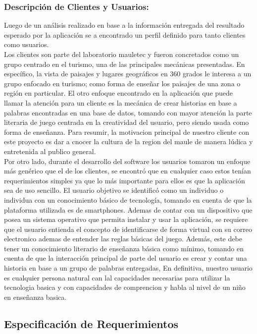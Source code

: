 \subsubsection{Descripción de Clientes y Usuarios:}
Luego de un análisis realizado en base a la información entregada del resultado esperado por la aplicación se a encontrado un perfil definido para tanto clientes como usuarios.\\
Los clientes son parte del laboratorio mauletec y fueron concretados como un grupo centrado en el turismo, una de las principales mecánicas presentadas. En específico, la vista de paisajes y lugares geográficos en 360 grados le interesa a un grupo enfocado en turismo; como forma de enseñar los paisajes de una zona o región en particular. El otro enfoque encontrado en la aplicación que puede llamar la atención para un cliente es la mecánica de crear historias en base a palabras encontradas en una base de datos, tomando con mayor atención la parte literaria de juego centrada en la creatividad del usuario, pero siendo usada como forma de enseñanza. Para resumir, la motivacion principal de nuestro cliente con este proyecto es dar a cnocer la cultura de la region del maule de manera lúdica y entretenida al publico general.\\
Por otro lado, durante el desarrollo del software los usuarios tomaron un enfoque más genérico que el de los clientes, se encontró que en cualquier caso estos tenían requerimientos  simples ya que lo más importante para ellos es que la aplicación sea de uso sencillo. El usuario objetivo se identificó como un individuo o individua con un conocimiento básico de tecnología, tomando en cuenta de que la plataforma utilizada es de smartphones. Ademas de contar con un dispositivo que posea un sistema operativo que permita instalar y usar la aplicación, se requiere que el usuario entienda el concepto de identificarse de forma virtual con su correo electronico ademas de entender las reglas básicas del juego. Además, este debe tener un conocimiento literario de enseñanza básica como mínimo, tomando en cuenta de que la interacción principal de parte del usuario es crear y contar una historia en base a un grupo de palabras entregadas, En definitiva, nuestro usuario es cualquier persona natural can lal capacidades necesarias para utilizar la tecnologia basica y con capacidades de comprencion y habla al nivel de un niño en enseñanza basica.
\newpage
\subsection{Especificación de Requerimientos}
